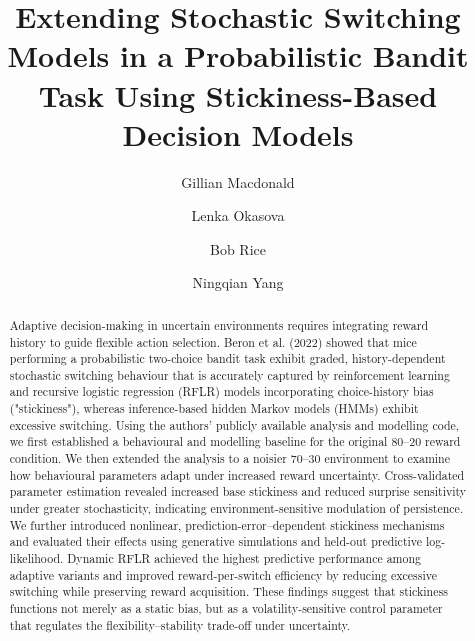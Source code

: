 \documentclass[11pt, reprint, aps, prl]{revtex4-2}
\begin{document}
\title{Extending Stochastic Switching Models in a Probabilistic Bandit Task Using Stickiness-Based Decision Models}
\author{Gillian Macdonald}
\author{Lenka Okasova}
\author{Bob Rice}
\author{Ningqian Yang}



\begin{abstract}
\setlength{\parindent}{0pt}
Adaptive decision-making in uncertain environments requires integrating reward history to guide flexible action selection. Beron et al. (2022) showed that mice performing a probabilistic two-choice bandit task exhibit graded, history-dependent stochastic switching behaviour that is accurately captured by reinforcement learning and recursive logistic regression (RFLR) models incorporating choice-history bias ("stickiness"), whereas inference-based hidden Markov models (HMMs) exhibit excessive switching. 
Using the authors' publicly available analysis and modelling code, we first established a behavioural and modelling baseline for the original 80--20 reward condition. We then extended the analysis to a noisier 70--30 environment to examine how behavioural parameters adapt under increased reward uncertainty. Cross-validated parameter estimation revealed increased base stickiness and reduced surprise sensitivity under greater stochasticity, indicating environment-sensitive modulation of persistence.
We further introduced nonlinear, prediction-error--dependent stickiness mechanisms and evaluated their effects using generative simulations and held-out predictive log-likelihood. Dynamic RFLR achieved the highest predictive performance among adaptive variants and improved reward-per-switch efficiency by reducing excessive switching while preserving reward acquisition. 
These findings suggest that stickiness functions not merely as a static bias, but as a volatility-sensitive control parameter that regulates the flexibility--stability trade-off under uncertainty.
\end{abstract}
\maketitle 
\end{document}
